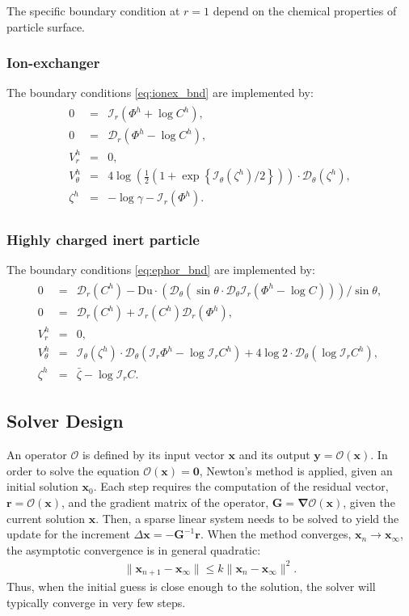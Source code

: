 \documentclass[10pt]{ijnam}
\newcommand{\pars}[1]{\left(#1\right)}
\newcommand\bnabla{\boldsymbol{\nabla}}
\newcommand\bG{\boldsymbol{G}}
\newcommand\bx{\boldsymbol{x}}
\newcommand\by{\boldsymbol{y}}
\newcommand\br{\boldsymbol{r}}
\newcommand\bzero{\boldsymbol{0}}
\newcommand\cO{\mathcal{O}}
\newcommand\cI{\mathcal{I}}
\newcommand\cD{\mathcal{D}}
\begin{document}
The specific boundary condition at $r=1$
depend on the chemical properties of particle surface.

\subsubsection{Ion-exchanger} The boundary conditions \eqref{eq:ionex_bnd} 
are implemented by:
\begin{eqnarray*}
\begin{array}{rcl}
0 &=& \cI_r(\varPhi^h + \log C^h), \\
0 &=& \cD_r(\varPhi^h - \log C^h), \\
V^h_r &=& 0, \\
V^h_\theta &=& 4\log\pars{\frac{1}{2}\pars{1 + \exp\left\{\cI_\theta(\zeta^h)/2\right\}}} \cdot 
			\cD_\theta(\zeta^h), \\
  \zeta^h &=& - \log \gamma - \cI_r(\varPhi^h).
\end{array}
\end{eqnarray*}

\subsubsection{Highly charged inert particle} The boundary conditions \eqref{eq:ephor_bnd} 
are implemented by:
\begin{eqnarray*}
\begin{array}{rcl}
0 &=& \cD_r(C^h) - \text{Du} \cdot 
\pars{\cD_\theta \pars{\sin\theta \cdot \cD_\theta \cI_r\pars{\varPhi^h - \log C}}}/{\sin\theta}, \\
0 &=& \cD_r(C^h) + \cI_r(C^h) \cD_r(\varPhi^h), \\
V^h_r &=& 0, \\
V^h_\theta &=& \cI_\theta(\zeta^h) \cdot \cD_\theta(\cI_r \varPhi^h - \log \cI_r C^h) + 
4 \log 2 \cdot \cD_\theta(\log \cI_r C^h), \\
  \zeta^h &=& \bar{\zeta} - \log \cI_r C.
\end{array}
\end{eqnarray*}

\subsection{Solver Design}
An operator $\cO$ is defined by its input vector $\bx$ and its output 
$\by = \cO(\bx)$.
In order to solve the equation $\cO(\bx) = \bzero$, Newton's method is applied, 
given an initial solution $\bx_0$.
Each step requires the computation of the residual vector, $\br = \cO(\bx)$, and
the gradient matrix of the operator, $\bG = \bnabla \cO(\bx)$, 
given the current solution $\bx$.
Then, a sparse linear system needs to be solved to yield the update for the 
increment $\Delta \bx = -\bG^{-1} \br$.
When the method converges, $\bx_n \rightarrow \bx_\infty$, 
the asymptotic convergence is in general quadratic:
\begin{eqnarray*}
\|\bx_{n+1} - \bx_\infty\| \le k \|\bx_{n} - \bx_\infty\|^2.
\end{eqnarray*}
Thus, when the initial guess is close enough to the solution, the solver
will typically converge in very few steps.
\end{document}

